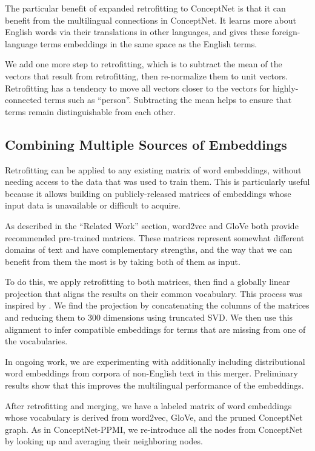 \documentclass[letterpaper]{article}
\begin{document}
The particular benefit of expanded retrofitting to ConceptNet is that it can
benefit from the multilingual connections in ConceptNet. It learns more about
English words via their translations in other languages, and gives these
foreign-language terms embeddings in the same space as the English terms.

We add one more step to retrofitting, which is to subtract the mean of the
vectors that result from retrofitting, then re-normalize them to unit vectors.
Retrofitting has a tendency to move all vectors closer to the vectors for
highly-connected terms such as ``person''. Subtracting the mean helps to ensure
that terms remain distinguishable from each other.

\subsection{Combining Multiple Sources of Embeddings}

Retrofitting can be applied to any existing matrix of word embeddings, without
needing access to the data that was used to train them. This is particularly
useful because it allows building on publicly-released matrices of embeddings
whose input data is unavailable or difficult to acquire.

As described in the ``Related Work'' section, word2vec and GloVe both provide
recommended pre-trained matrices. These matrices represent somewhat different
domains of text and have complementary strengths, and the way that we can
benefit from them the most is by taking both of them as input.

To do this, we apply retrofitting to both matrices, then find a globally
linear projection that aligns the results on their common vocabulary.
This process was inspired by \citeauthor{zhao2015learning} .
We find the projection by concatenating the columns of the matrices and reducing
them to 300 dimensions using truncated SVD. We then use this alignment to infer
compatible embeddings for terms that are missing from one of the vocabularies.

In ongoing work, we are experimenting with additionally including
distributional word embeddings from corpora of non-English text in this merger.
Preliminary results show that this improves the multilingual performance of the
embeddings.

After retrofitting and merging, we have a labeled matrix of word embeddings
whose vocabulary is derived from word2vec, GloVe, and the pruned ConceptNet
graph. As in ConceptNet-PPMI, we re-introduce all the nodes from ConceptNet by
looking up and averaging their neighboring nodes.
\end{document}
